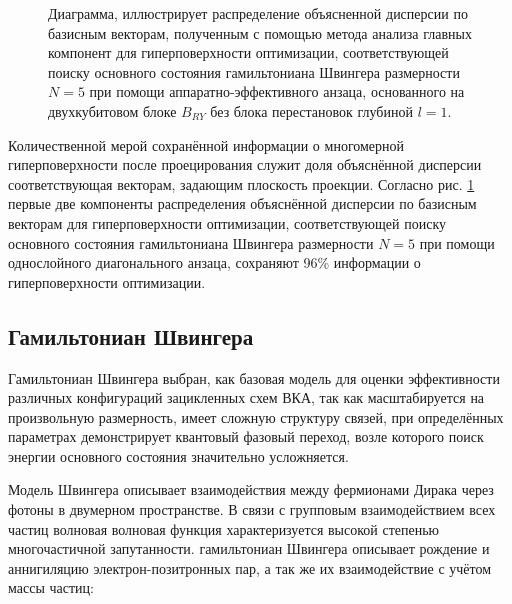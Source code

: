 \documentclass[14pt]{extarticle}
\begin{document}
\begin{figure}[H]
\caption{Диаграмма, иллюстрирует распределение объясненной дисперсии по базисным векторам, полученным с помощью метода анализа главных компонент для гиперповерхности оптимизации, соответствующей поиску основного состояния гамильтониана Швингера размерности $N = 5$ при помощи аппаратно-эффективного анзаца, основанного на двухкубитовом блоке $B_{RY}$ без блока перестановок глубиной $l = 1$.} \label{fig:disp_bar}
\end{figure}

\qquad Количественной мерой сохранённой информации о многомерной гиперповерхности после проецирования служит доля объяснённой дисперсии соответствующая векторам, задающим плоскость проекции. Согласно рис. \ref{fig:disp_bar} первые две компоненты распределения объяснённой дисперсии по базисным векторам для гиперповерхности оптимизации, соответствующей поиску основного состояния гамильтониана Швингера размерности $N = 5$ при помощи однослойного диагонального анзаца, сохраняют 96\% информации о гиперповерхности оптимизации.

\subsection{Гамильтониан Швингера}

\qquad Гамильтониан Швингера выбран, как базовая модель для оценки эффективности различных конфигураций зацикленных схем ВКА, так как масштабируется на произвольную размерность, имеет сложную структуру связей, при определённых параметрах демонстрирует квантовый фазовый переход, возле которого поиск энергии основного состояния значительно усложняется.

\qquad Модель Швингера описывает взаимодействия между фермионами Дирака через фотоны в двумерном пространстве. В связи с групповым взаимодействием всех частиц волновая волновая функция характеризуется высокой степенью многочастичной запутанности. гамильтониан Швингера описывает рождение и аннигиляцию электрон-позитронных пар, а так же их взаимодействие с учётом массы частиц:
\end{document}
